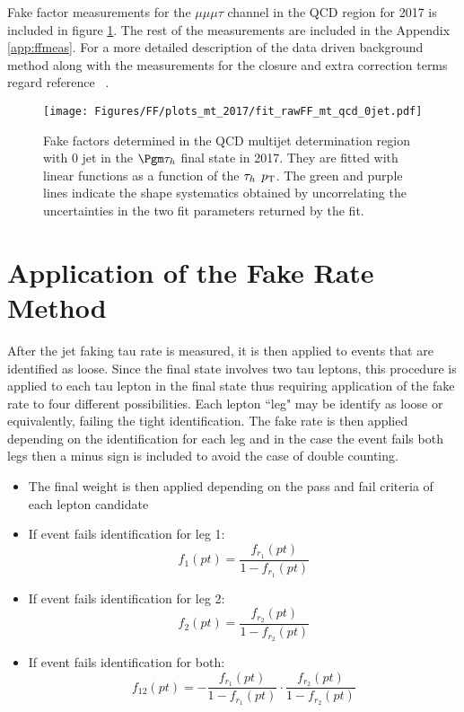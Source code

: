 Fake factor measurements for the $\mu\mu\mu\tau$ channel in the QCD region for 2017 is included in figure \ref{fig:fit_raw_mt_0jet_qcd}. 
The rest of the measurements are included in the Appendix \ref{app:ffmeas}. For a more detailed description of the data driven background method along with the measurements for the closure and extra correction terms regard reference ~\cite{AN16355}.




\begin{figure}[ht!b]
\centering
\texttt{[image: Figures/FF/plots\_mt\_2017/fit\_rawFF\_mt\_qcd\_0jet.pdf]}\\
\caption{\label{fig:fit_raw_mt_0jet_qcd} Fake factors determined in the QCD multijet determination region with 0 jet in the $\Pgm\tauh$ final state in 2017. They are fitted with linear functions as a function of the $\tau_h$ $p_{\mathrm{T}}$. The green and purple lines indicate the shape systematics obtained by uncorrelating the uncertainties in the two fit parameters returned by the fit.  }
\end{figure}





\clearpage

\section{Application of the Fake Rate Method}

After the jet faking tau rate is measured, it is then applied to events that are identified as loose. Since the final state involves two tau leptons, this procedure is applied to each tau lepton in the final state thus requiring application of the fake rate to four different possibilities. Each lepton ``leg" may be identify as loose or equivalently, failing the tight identification. The fake rate is then applied depending on the identification for each leg and in the case the event fails both legs then a minus sign is included to avoid the case of double counting. 
\begin{itemize}
\item{The final weight is then 
applied depending on the 
pass and fail criteria of each 
lepton candidate}
\item{If event fails identification for leg 1:\begin{equation}f_1(pt)=\frac{f_{r_1}(pt)}{1-f_{r_1}(pt)}\end{equation}}
\item{If event fails identification for leg 2:\begin{equation}f_2(pt)=\frac{f_{r_2}(pt)}{1-f_{r_2}(pt)}\end{equation}}
\item{If event fails identification for both:\begin{equation}f_{12}(pt)=-\frac{f_{r_1}(pt)}{1-f_{r_1}(pt)}\cdot\frac{f_{r_2}(pt)}{1-f_{r_2}(pt)}\end{equation}}
\end{itemize}


